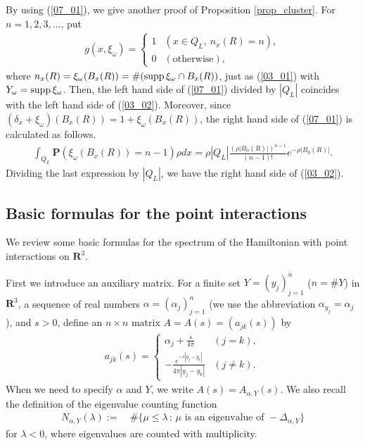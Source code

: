 \documentclass[12pt,a4paper]{article}
\def\supp{\mathop{\rm supp}\nolimits}
\begin{document}
By using (\ref{07_01}),
we give another proof of Proposition \ref{prop_cluster}.
For $n=1,2,3,\ldots$, put
\begin{align*}
 g(x,\xi_\omega)
=
\begin{cases}
 1 & (x\in Q_L,\ n_x(R)=n),\\
 0 & (\mbox{otherwise}),
\end{cases}
\end{align*}
where $n_x(R)=\xi_\omega(B_x(R))=\#(\supp\xi_\omega \cap B_x(R))$, 
just as (\ref{03_01}) with $Y_\omega=\supp \xi_\omega$.
Then, the left hand side of (\ref{07_01}) divided by $|Q_L|$ 
coincides with the left hand side of (\ref{03_02}).
Moreover, 
since $(\delta_x + \xi_\omega)(B_x(R))= 1 + \xi_\omega(B_x(R))$,
the right hand side of (\ref{07_01}) is calculated as follows.
\begin{align*}
 \int_{Q_L}
\mathbf{P}(\xi_\omega(B_x(R))=n-1)\rho dx
=
\rho |Q_L|\frac{(\rho|B_0(R)|)^{n-1}}{(n-1)!}e^{-\rho |B_0(R)|}.
\end{align*}
Dividing the last expression by $|Q_L|$,
we have the right hand side of (\ref{03_02}).


\subsection{Basic formulas for the point interactions}
We review some basic formulas for the spectrum of the
Hamiltonian with point interactions on $\mathbf{R}^3$.

First we introduce an auxiliary matrix.
For a finite set $Y=(y_j)_{j=1}^n$ ($n=\#Y$) in $\mathbf{R}^3$,
a sequence of real numbers $\alpha=(\alpha_j)_{j=1}^n$
(we use the abbreviation $\alpha_{y_j}=\alpha_j$),
and $s>0$,
define an $n\times n$ matrix $A=A(s)=(a_{jk}(s))$ by
\begin{align}
\label{07_02}
 a_{jk}(s)
=
\begin{cases}
\displaystyle
\alpha_j + \frac{s}{4\pi} & (j=k),\\[2mm]
\displaystyle
-\frac{e^{-s|y_j-y_k|}}{4\pi |y_j-y_k|} & (j\not=k).
\end{cases}
\end{align}
When we need to specify $\alpha$ and $Y$,
we write $A(s)=A_{\alpha,Y}(s)$.
We also recall the definition of the eigenvalue counting function
\begin{align*}
  N_{\alpha,Y}(\lambda):=&\ 
\#\{\mu \leq \lambda \,;\,
\mu \mbox{ is an eigenvalue of }- \Delta_{\alpha,Y} \}
\end{align*}
for $\lambda<0$,
where eigenvalues are counted with multiplicity.
\end{document}
